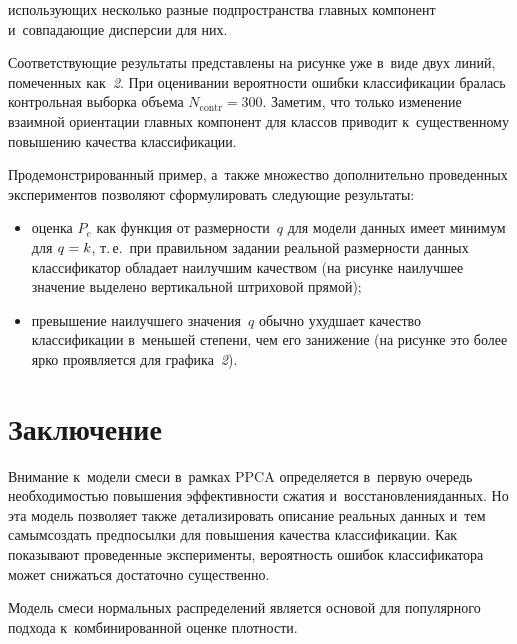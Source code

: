 \begin{multicols}{2}
\noindent
 использующих несколько разные 
подпространства главных компонент и~совпадающие дисперсии для них. 

Соответствующие результаты представлены на рисунке уже в~виде двух линий, 
помеченных как~\textit{2}. При оценивании вероятности ошибки классификации 
бралась контрольная выборка объема $N_{\mathrm{contr}}=300$. Заметим, что только 
изменение взаимной ориентации главных компонент для классов приводит 
к~существенному повышению качества классификации.
     
     Продемонстрированный пример, а~также множество дополнительно 
проведенных экспериментов позволяют сформулировать следующие 
результаты:
     \begin{itemize}
     \item оценка $P_e$ как функция от размерности~$q$ для модели данных 
имеет минимум для $q\hm=k$, т.\,е.\ при правильном задании реальной 
раз\-мер\-ности данных классификатор обладает наилучшим качеством (на 
рисунке наилучшее значение   выделено вертикальной штриховой прямой);
\item превышение наилучшего значения~$q$ обычно ухудшает качество 
классификации в~меньшей степени, чем его занижение (на рисунке это более 
ярко проявляется для графика~\textit{2}).
\end{itemize}


\section{Заключение}

     Внимание к~модели смеси в~рамках PPCA определяется в~первую очередь 
необходимостью повышения эффективности сжатия и~восстановления\linebreak данных. 
Но эта модель позволяет также детализировать описание реальных данных 
и~тем самым\linebreak создать предпосылки для повышения качества классификации. 
Как показывают проведенные эксперименты, вероятность ошибок 
классификатора может снижаться достаточно существенно.
     
Модель смеси нормальных распределений является основой для 
популярного подхода к~комбинированной оценке плотности. 


\end{multicols}
